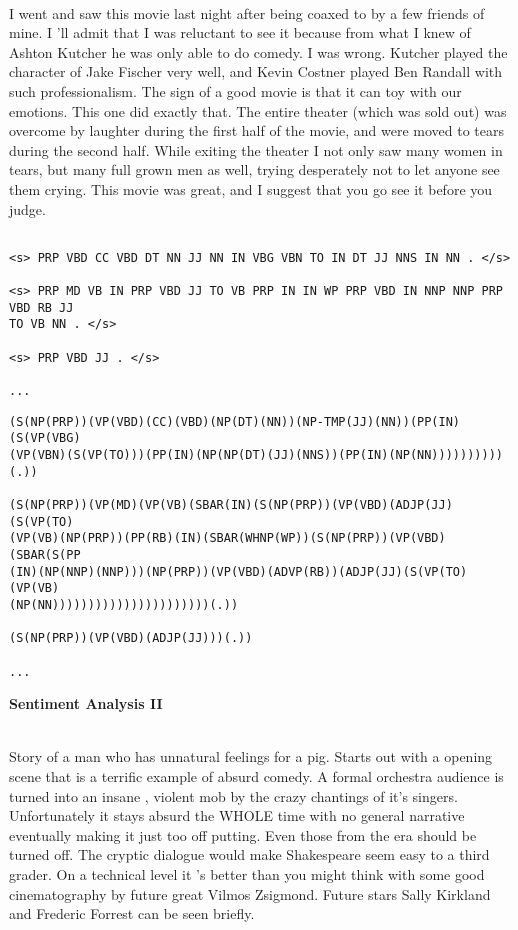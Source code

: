\documentclass[11pt]{article}
\begin{document}
~\\

I went and saw this movie last night after being coaxed to by a few friends of
mine. I 'll admit that I was reluctant to see it because from what I knew
of Ashton Kutcher he was only able to do comedy.  I was wrong. Kutcher played
the character of Jake Fischer very well, and Kevin Costner played Ben Randall
with such professionalism. The sign of a good movie is that it can toy with our
emotions.  This one did exactly that. The entire theater (which was sold out)
was overcome by laughter during the first half of the movie, and were moved to
tears during the second half. While exiting the theater I not only saw many
women in tears, but many full grown men as well, trying desperately not to let
anyone see them crying. This movie was great, and I suggest that you go see it
before you judge.

\begin{verbatim}

<s> PRP VBD CC VBD DT NN JJ NN IN VBG VBN TO IN DT JJ NNS IN NN . </s>

<s> PRP MD VB IN PRP VBD JJ TO VB PRP IN IN WP PRP VBD IN NNP NNP PRP VBD RB JJ
TO VB NN . </s>

<s> PRP VBD JJ . </s>

...
\end{verbatim}

\begin{verbatim}
(S(NP(PRP))(VP(VBD)(CC)(VBD)(NP(DT)(NN))(NP-TMP(JJ)(NN))(PP(IN)(S(VP(VBG)
(VP(VBN)(S(VP(TO)))(PP(IN)(NP(NP(DT)(JJ)(NNS))(PP(IN)(NP(NN))))))))))(.))

(S(NP(PRP))(VP(MD)(VP(VB)(SBAR(IN)(S(NP(PRP))(VP(VBD)(ADJP(JJ)(S(VP(TO)
(VP(VB)(NP(PRP))(PP(RB)(IN)(SBAR(WHNP(WP))(S(NP(PRP))(VP(VBD)(SBAR(S(PP
(IN)(NP(NNP)(NNP)))(NP(PRP))(VP(VBD)(ADVP(RB))(ADJP(JJ)(S(VP(TO)(VP(VB)
(NP(NN))))))))))))))))))))))(.))

(S(NP(PRP))(VP(VBD)(ADJP(JJ)))(.))

...
\end{verbatim}

\newpage

\textbf{Sentiment Analysis II}

~\\

Story of a man who has unnatural feelings for a pig.  Starts out with a opening
scene that is a terrific example of absurd comedy.  A formal orchestra audience
is turned into an insane , violent mob by the crazy chantings of it's singers.
Unfortunately it stays absurd the WHOLE time with no general narrative
eventually making it just too off putting.  Even those from the era should be
turned off.  The cryptic dialogue would make Shakespeare seem easy to a third
grader.  On a technical level it 's better than you might think with some good
cinematography by future great Vilmos Zsigmond.  Future stars Sally Kirkland and
Frederic Forrest can be seen briefly.
\end{document}

